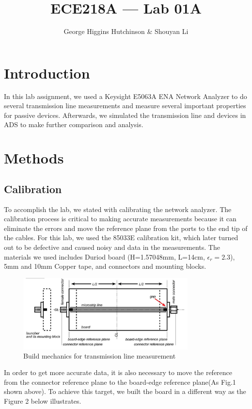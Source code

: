 \documentclass{article}
\title{ECE218A --- Lab 01A}
\author{George Higgins Hutchinson \& Shouyan Li}
\begin{document}
\maketitle

\section{Introduction}

In this lab assignment, we used a Keysight E5063A ENA Network Analyzer to do several transmission line measurements and measure several important properties for passive devices. Afterwards, we simulated the transmission line and devices in ADS to make further comparison and analysis.

\section{Methods}

\subsection{Calibration}

To accomplish the lab, we stated with calibrating the network analyzer. The calibration process is critical to making accurate measurements because it can eliminate the errors and move the reference plane from the ports to the end tip of the cables. For this lab, we used the 85033E calibration kit, which later turned out to be defective and caused noisy and data in the measurements. The materials we used includes Duriod board (H=1.57048mm, L=14cm, $\epsilon_{r}=2.3 $), 5mm and 10mm Copper tape, and connectors and mounting blocks.


\begin{figure}[h]
    \centering
    \includegraphics[width=0.8\textwidth]{figures/Short.jpg}
    \caption{Build mechanics for transmission line measurement}
\end{figure}

\begin{flushleft}
In order to get more accurate data, it is also necessary to move the reference from the connector reference plane to the board-edge reference plane(As Fig.1 shown above). To achieve this target, we built the board in a different way as the Figure 2 below illustrates.
\end{flushleft}
\end{document}
